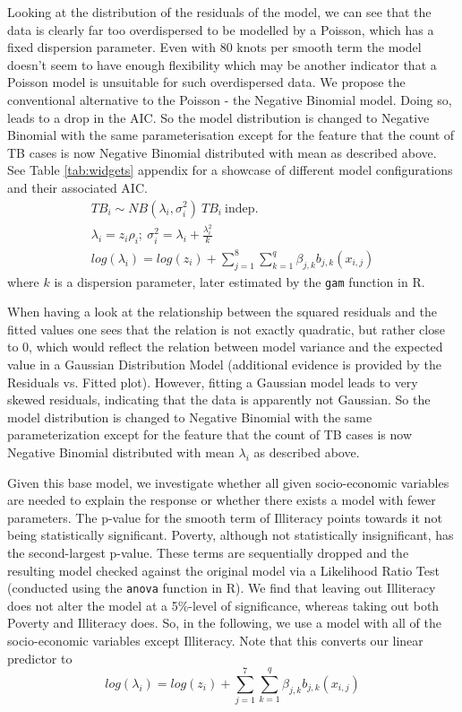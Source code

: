 \documentclass{article}
\begin{document}
Looking at the distribution of the residuals of the model, we can see that the data is clearly far too overdispersed to be modelled by a Poisson, which has a fixed dispersion parameter. Even with 80 knots per smooth term the model doesn't seem to have enough flexibility which may be another indicator that a Poisson model is unsuitable for such overdispersed data. We propose the conventional alternative to the Poisson - the Negative Binomial model. Doing so, leads to a drop in the AIC. So the model distribution is changed to Negative Binomial with the same parameterisation except for
the feature that the count of TB cases is now Negative Binomial distributed with mean as described above.
See Table \ref{tab:widgets} appendix for a showcase of different model configurations and their associated AIC.
$$
\begin{aligned}
TB_i \sim NB(\lambda_i , \sigma_i^2) \ TB_i\  \mathrm{indep.} 
\\
\lambda_i = z_i \rho_i ;\ \sigma_i^2 = \lambda_i +\frac{\lambda_i^2}{k}
\\
log(\lambda_i) = log(z_i) +  \sum_{j=1}^{8}\sum_{k=1}^{q}\beta_{j,k}b_{j,k}(x_{i,j})
\end{aligned}
$$
where $k$ is a dispersion parameter, later estimated by  the  \texttt{gam} function in R.
\newline

When having a look at the relationship between the squared residuals and the fitted values one sees that the relation is not exactly quadratic, but rather close to 0, which would reflect the relation between model variance and the expected value in a Gaussian Distribution Model (additional evidence is provided by the Residuals vs. Fitted plot). However, fitting a Gaussian model leads to very skewed residuals, indicating that the data is apparently not Gaussian. So the model distribution is changed to Negative Binomial with the same parameterization except for the feature that the count of TB cases is now Negative Binomial distributed with mean $\lambda_{i}$ as described above.
\newline

Given this base model, we investigate whether all given socio-economic variables are needed to explain the response or whether there exists a model with fewer parameters. The p-value for the smooth term of Illiteracy points towards it not being statistically significant. Poverty, although not statistically insignificant, has the second-largest p-value. These terms are sequentially dropped and the resulting model checked against the original model via a Likelihood Ratio Test (conducted using the \texttt{anova} function in R). We find that leaving out Illiteracy does not alter the model at a 5\%-level of significance, whereas taking out both Poverty and Illiteracy does. So, in the following, we use a model with all of the socio-economic variables except Illiteracy. Note that this converts our linear predictor to 
$$
log(\lambda_i) = log(z_i) +  \sum_{j=1}^{7}\sum_{k=1}^{q}\beta_{j,k}b_{j,k}(x_{i,j})
$$
\newline
\end{document}
